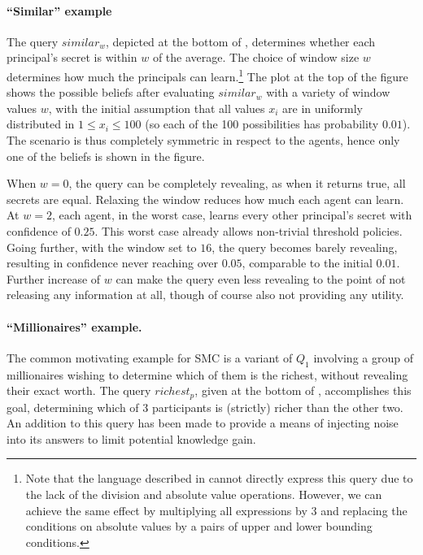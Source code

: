 \documentclass[10pt]{sigplanconf}
\begin{document}
\paragraph*{``Similar'' example} The query $ similar_w $, depicted at
the bottom of , determines
whether each principal's secret is within $ w $ of the
average. The choice of window size $ w $ determines how much the
principals can learn.\footnote{Note that the language described in
   cannot
directly express this query due to the lack of the division and absolute
value operations. However, we can achieve the same effect by
multiplying all expressions by 3 and replacing the conditions on
absolute values by a pairs of upper and lower bounding conditions.}
The plot at the top of the figure shows the possible beliefs after evaluating $
similar_w $ with a variety of window values $ w $, with the initial
assumption that all values $ x_i $ are in uniformly distributed in $
1 \leq x_i \leq 100 $ (so each of the 100 possibilities has
probability $0.01$). The scenario
is thus completely symmetric in respect to the agents, hence only one
of the beliefs is shown in the figure.

When $ w = 0 $, the query can be completely revealing, as when it
returns true, all secrets are equal. Relaxing the window reduces how
much each agent can learn. At $ w = 2 $, each agent, in the worst
case, learns every other principal's secret with confidence of $ 0.25
$. This worst case already allows non-trivial threshold
policies. Going further, with the window set to $ 16 $, the query
becomes barely revealing, resulting in confidence never reaching over
$ 0.05 $, comparable to the initial $ 0.01 $. Further increase of $ w
$ can make the query even less revealing to the point of not releasing
any information at all, though of course also not providing any
utility.

\paragraph*{``Millionaires'' example.} The common motivating example
for SMC is a variant of $Q_1$ involving
a group of millionaires wishing to determine which of them is the
richest, without revealing their exact worth. The query $ richest_p $,
given at the bottom of ,
accomplishes this goal, determining which of 3 participants is
(strictly) richer than the other two. An addition to this query has
been made to provide a means of injecting noise into its answers to
limit potential knowledge gain.
\end{document}
